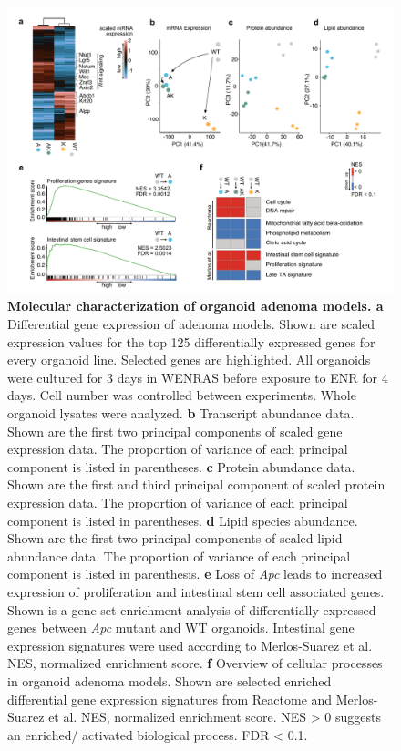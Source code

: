 \begin{flushleft}
\begin{figure}[h]
\centering
\includegraphics[width=\textwidth,
                height=\textheight,
                keepaspectratio]{figures/adenomaprofiling/pdf/fig_1_6_1_2.pdf}
\caption[Molecular characterization of organoid adenoma models]{\textbf{Molecular characterization of organoid adenoma models. a} Differential gene expression of adenoma models. Shown are scaled expression values for the top 125 differentially expressed genes for every organoid line. Selected genes are highlighted. All organoids were cultured for 3 days in WENRAS before exposure to ENR for 4 days. Cell number was controlled between experiments. Whole organoid lysates were analyzed. 
\textbf{b} Transcript abundance data. Shown are the first two principal components of scaled gene expression data. The proportion of variance of each principal component is listed in parentheses. 
\textbf{c} Protein abundance data. Shown are the first and third principal component of scaled protein expression data. The proportion of variance of each principal component is listed in parentheses. 
\textbf{d} Lipid species abundance. Shown are the first two principal components of scaled lipid abundance data. The proportion of variance of each principal component is listed in parenthesis. 
\textbf{e} Loss of \textit{Apc} leads to increased expression of proliferation and intestinal stem cell associated genes. Shown is a gene set enrichment analysis of differentially expressed genes between \textit{Apc} mutant and WT organoids. Intestinal gene expression signatures were used according to Merlos-Suarez et al. NES, normalized enrichment score. 
\textbf{f} Overview of cellular processes in organoid adenoma models. Shown are selected enriched differential gene expression signatures from Reactome and Merlos-Suarez et al. NES, normalized enrichment score. NES > 0 suggests an enriched/ activated biological process. FDR < 0.1.}
\label{fig_161}
\end{figure}
\bigbreak


\end{flushleft}
